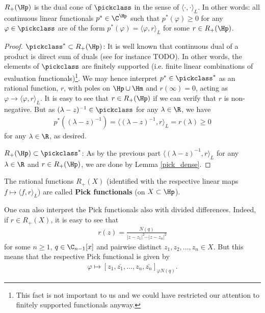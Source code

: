 \begin{lause}\label{pick_functionals}
	$R_{+}(\Hp)$ is the dual cone of $\pickclass$ in the sense of $\langle \cdot, \cdot \rangle_{L}$. In other words: all continuous linear functionals $p^{*} \in \C^{\Hp}$ such that $p^{*}(\varphi) \geq 0$ for any $\varphi \in \pickclass$ are of the form $p^{*}(\varphi) = \langle \varphi, r \rangle_{L}$ for some $r \in R_{+}(\Hp)$.
\end{lause}
\begin{proof}
	$\pickclass^{*} \subset R_{+}(\Hp)$: It is well known that continuous dual of a product is direct sum of duals (see for instance TODO). In other words, the elements of $\pickclass$ are finitely supported (i.e. finite linear combinations of evaluation functionals)\footnote{This fact is not important to us and we could have restricted our attention to finitely supported functionals anyway.}. We may hence interpret $p^{*} \in \pickclass^{*}$ as an rational function, $r$, with poles on $\Hp \cup \Hm$ and $r(\infty) = 0$, acting as $\varphi \to \langle \varphi, r \rangle_{L}$. It is easy to see that $r \in R_{+}(\Hp)$ if we can verify that $r$ is non-negative. But as $(\lambda - z)^{-1} \in \pickclass$ for any $\lambda \in \R$, we have
	\begin{align*}
		p^{*}((\lambda - z)^{-1}) = \langle (\lambda - z)^{-1}, r \rangle_{L} = r(\lambda) \geq 0
	\end{align*}
	for any $\lambda \in \R$, as desired.

	$R_{+}(\Hp) \subset \pickclass^{*}$: As by the previous part $\langle (\lambda - z)^{-1}, r \rangle_{L}$ for any $\lambda \in \R$ and $r \in R_{+}(\Hp)$, we are done by Lemma \ref{pick_dense}.
\end{proof}

The rational functions $R_{+}(X)$ (identified with the respective linear maps $f \mapsto \langle f, r \rangle_{L}$) are called \textbf{Pick functionals} (on $X \subset \Hp$).

One can also interpret the Pick functionals also with divided differences. Indeed, if $r \in R_{+}(X)$, it is easy to see that
\begin{align*}
	r(z) = \frac{N(q)}{|z - z_{1}|^2 \cdots |z - z_{n}|^2}
\end{align*}
for some $n \geq 1$, $q \in \C_{n - 1}[x]$ and pairwise distinct $z_{1}, z_{2}, \ldots, z_{n} \in X$. But this means that the respective Pick functional is given by
\begin{align*}
	\varphi \mapsto [z_{1}, \overline{z_{1}}, \ldots, z_{n}, \overline{z_{n}}]_{\varphi N(q)}.
\end{align*}

